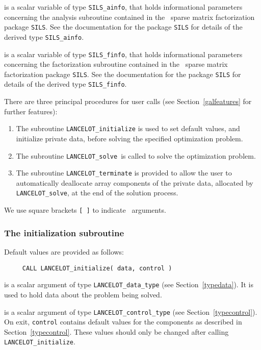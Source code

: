 \documentclass{galahad}
\newcommand{\fullpackagename}{LANC\-E\-LOT}
\newcommand{\solver}{{\tt \fullpackagename\_solve}}
\begin{document}
\begin{description}
 is a scalar variable of type {\tt SILS\_ainfo}, that holds
informational parameters concerning the analysis subroutine contained in
the \galahad\ sparse matrix factorization package {\tt SILS}.
See the documentation for the package {\tt SILS} for details of the
derived type {\tt SILS\_ainfo}.

 is a scalar variable of type {\tt SILS\_finfo}, that holds
informational parameters concerning the factorization subroutine contained in
the \galahad\ sparse matrix factorization package {\tt SILS}.
See the documentation for the package {\tt SILS} for details of the
derived type {\tt SILS\_finfo}.

\end{description}


\galarguments
There are three principal procedures for user calls
(see Section~\ref{galfeatures} for further features):

\begin{enumerate}
\item The subroutine
      {\tt \fullpackagename\_initialize}
      is used to set default values, and initialize private data,
      before solving the specified optimization problem.
\item The subroutine
      \solver\
      is called to solve the optimization problem.
\item The subroutine
      {\tt \fullpackagename\_terminate}
      is provided to allow the user to automatically deallocate array
       components of the private data, allocated by
       \solver,
       at the end of the solution process.
\end{enumerate}
We use square brackets {\tt [ ]} to indicate \optional\ arguments.


\subsubsection{The initialization subroutine}\label{subinit}
 Default values are provided as follows:
\hskip0.5in
\def\baselinestretch{0.8} {\tt \begin{verbatim}
     CALL LANCELOT_initialize( data, control )
\end{verbatim}}
\def\baselinestretch{1.0}

\begin{description}
 is a scalar \intentinout argument of type
{\tt \fullpackagename\_data\_type}
(see Section~\ref{typedata}). It is used to hold data about the problem being
solved.

 is a scalar \intentout argument of type
{\tt \fullpackagename\_control\_type}
(see Section~\ref{typecontrol}).
On exit, {\tt control} contains default values for the components as
described in Section~\ref{typecontrol}.
These values should only be changed after calling
{\tt \fullpackagename\_initialize}.

\end{description}
\end{document}
